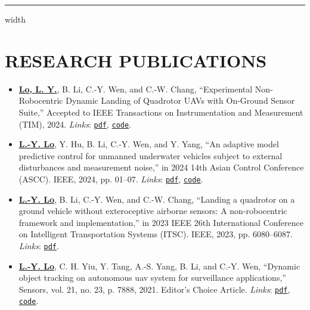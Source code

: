 \documentclass[overlapped]{res}
\newcommand{\pink}[1]{\textcolor{pink!40!red}{#1}} %
\begin{document}
\begin{resume}
\par\noindent\hrule width \linewidth %


\section{RESEARCH PUBLICATIONS}
\begin{itemize}
  \item \underline{\textbf{Lo, L. Y.}}, B. Li, C.-Y. Wen, and C.-W. Chang, ``Experimental Non-Robocentric Dynamic Landing of Quadrotor UAVs with On-Ground Sensor Suite,'' Accepted to IEEE Transactions on Instrumentation and Measurement (TIM), 2024. \textit{Links}: \pink{{\texttt{\href{https://pattylo.github.io/assets/pdf/alan_tim.pdf}{pdf}}}}, \pink{ {\texttt{\href{https://github.com/HKPolyU-UAV/ALAN}{code}}}}.
  \item \underline{\textbf{L.-Y. Lo}}, Y. Hu, B. Li, C.-Y. Wen, and Y. Yang, ``An adaptive model predictive control for unmanned underwater vehicles subject to external disturbances and measurement noise,'' in 2024 14th Asian Control Conference (ASCC). IEEE, 2024, pp. 01–07. \textit{Links}: \pink{{\texttt{\href{https://pattylo.github.io/assets/pdf/ascc.pdf}{pdf}}}}, \pink{{\texttt{\href{https://github.com/HKPolyU-UAV/bluerov2/tree/eskf_obs2}{code}}}}.
  \item \underline{\textbf{L.-Y. Lo}}, B. Li, C.-Y. Wen, and C.-W. Chang, ``Landing a quadrotor on a ground vehicle without exteroceptive airborne sensors: A non-robocentric framework and implementation,'' in 2023 IEEE 26th International Conference on Intelligent Transportation Systems (ITSC). IEEE, 2023, pp. 6080–6087. \textit{Links}: \pink{{\texttt{\href{https://pattylo.github.io/assets/pdf/alan_conf_final.pdf}{pdf}}}}.
  \item \underline{\textbf{L.-Y. Lo}}, C. H. Yiu, Y. Tang, A.-S. Yang, B. Li, and C.-Y. Wen, ``Dynamic object tracking on autonomous uav system for surveillance applications,'' Sensors, vol. 21, no. 23, p. 7888, 2021. Editor's Choice Article. \textit{Links}: \pink{{\texttt{\href{https://pattylo.github.io/assets/pdf/sensors-21-07888.pdf}{pdf}}}}, \pink{ {\texttt{\href{https://github.com/HKPolyU-UAV/auto}{code}}}}.

\end{itemize}
\end{resume}
\end{document}
